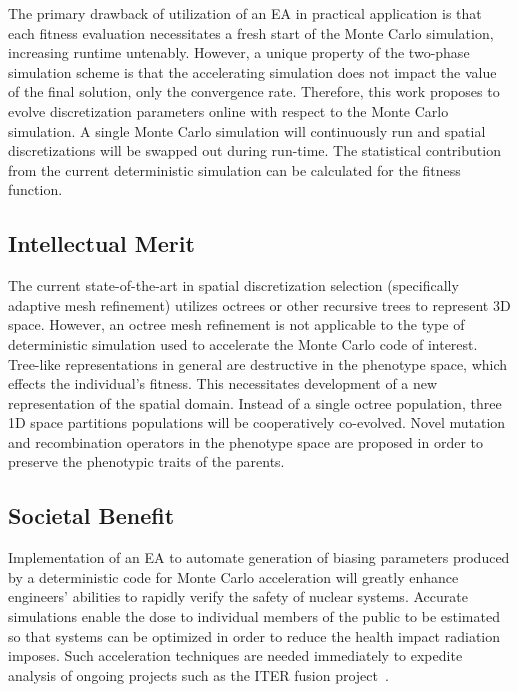 \documentclass{article}
\begin{document}
The primary drawback of utilization of an EA in practical application is that each fitness evaluation necessitates a fresh start of the Monte Carlo simulation, increasing runtime untenably. However, a unique property of the two-phase simulation scheme  is that the accelerating simulation does not impact the value of the final solution, only the convergence rate. Therefore, this work proposes to evolve discretization parameters online with respect to the Monte Carlo simulation. A single Monte Carlo simulation will continuously run and spatial discretizations will be swapped out during run-time. The statistical contribution from the current deterministic simulation can be calculated for the fitness function. 



\subsection{Intellectual Merit}\label{sec:a4}
The current state-of-the-art in spatial discretization selection (specifically adaptive mesh refinement) utilizes octrees or other recursive trees to represent 3D space. However, an octree mesh refinement is not applicable to the type of deterministic simulation used to accelerate the Monte Carlo code of interest. Tree-like representations in general are destructive in the phenotype space, which effects the individual's fitness. This necessitates development of a new representation of the spatial domain. Instead of a single octree population, three 1D space partitions populations will be cooperatively co-evolved. Novel mutation and recombination operators in the phenotype space are proposed in order to preserve the phenotypic traits of the parents.

\subsection{Societal Benefit}\label{sec:a5}
Implementation of an EA to automate generation of biasing parameters produced by a deterministic code for Monte Carlo acceleration will greatly enhance engineers' abilities to rapidly verify the safety of nuclear systems. Accurate simulations enable the dose to individual members of the public to be estimated so that systems can be optimized in order to reduce the health impact radiation imposes. Such acceleration techniques are needed immediately to expedite analysis of ongoing projects such as the ITER fusion project~\cite{ref:Santoro2008}.
\end{document}
